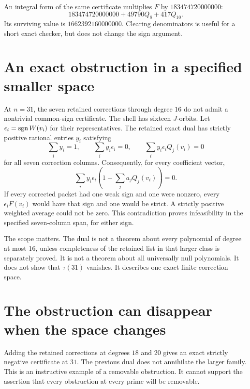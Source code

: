 An integral form of the same certificate multiplies $F$ by $183474720000000$:
\[
183474720000000+49790Q_8+417Q_{10}.
\]
Its surviving value is $1662392160000000$. Clearing denominators is useful for a short exact checker, but does not change the sign argument.


\section{An exact obstruction in a specified smaller space}
At $n=31$, the seven retained corrections through degree $16$ do not admit a nontrivial common-sign certificate. The shell has sixteen $J$-orbits. Let $\epsilon_i=\operatorname{sgn} W(v_i)$ for their representatives. The retained exact dual has strictly positive rational entries $y_i$ satisfying
\[
\sum_i y_i=1,\qquad\sum_i y_i\epsilon_i=0,\qquad
\sum_i y_i\epsilon_iQ_j(v_i)=0
\]
for all seven correction columns. Consequently, for every coefficient vector,
\[
\sum_i y_i\epsilon_i\left(1+\sum_j a_jQ_j(v_i)\right)=0.
\]
If every corrected packet had one weak sign and one were nonzero, every $\epsilon_iF(v_i)$ would have that sign and one would be strict. A strictly positive weighted average could not be zero. This contradiction proves infeasibility in the specified seven-column span, for either sign.

The scope matters. The dual is not a theorem about every polynomial of degree at most $16$, unless completeness of the retained list in that larger class is separately proved. It is not a theorem about all universally null polynomials. It does not show that $\tau(31)$ vanishes. It describes one exact finite correction space.

\section{The obstruction can disappear when the space changes}
Adding the retained corrections at degrees $18$ and $20$ gives an exact strictly negative certificate at $31$. The previous dual does not annihilate the larger family. This is an instructive example of a removable obstruction. It cannot support the assertion that every obstruction at every prime will be removable.

